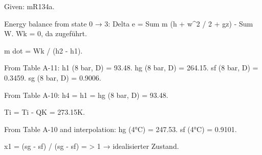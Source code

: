 Given: mR134a.  

Energy balance from state 0 → 3:  
Delta e = Sum m (h + w^2 / 2 + gz) - Sum W.  
Wk = 0, da zugeführt.  

m dot = Wk / (h2 - h1).  

From Table A-11:  
h1 (8 bar, D) = 93.48.  
hg (8 bar, D) = 264.15.  
sf (8 bar, D) = 0.3459.  
sg (8 bar, D) = 0.9006.  

From Table A-10:  
h4 = h1 = hg (8 bar, D) = 93.48.  

Ti = Ti - QK = 273.15K.  

From Table A-10 and interpolation:  
hg (4°C) = 247.53.  
sf (4°C) = 0.9101.  

x1 = (sg - sf) / (sg - sf) = > 1 → idealisierter Zustand.
